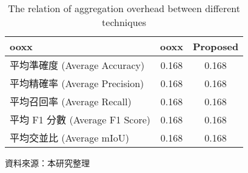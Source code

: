 
\begin{table}[H]
  \caption{The relation of aggregation overhead between different techniques}
  \label{tab:system}
  \centering
  \vspace{5pt}
  \begin{tabular}{|l|c|c|}
  \hline
  \textbf{ooxx} & \textbf{ooxx} & \textbf{Proposed} \\
  \hline
  平均準確度 (Average Accuracy) & 0.168 & 0.168 \\
  平均精確率 (Average Precision) & 0.168 & 0.168 \\
  平均召回率 (Average Recall) & 0.168 & 0.168 \\
  平均 F1 分數 (Average F1 Score) & 0.168 & 0.168 \\
  平均交並比 (Average mIoU) & 0.168 & 0.168 \\
  \hline
  \end{tabular}
  \flushleft \hspace{70pt} 資料來源：本研究整理 %
\end{table}